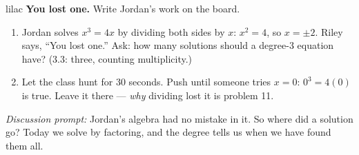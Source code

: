 \documentclass[10pt]{article}
\begin{document}
\begin{skillbox}{lilac}
    \textbf{You lost one.} Write Jordan's work on the board.
    \begin{enumerate}[itemsep=2pt]
        \item Jordan solves $x^3 = 4x$ by dividing both sides by $x$: $x^2 = 4$, so $x = \pm 2$.
              Riley says, ``You lost one.'' Ask: how many solutions should a degree-3
              equation have? (3.3: three, counting multiplicity.)
        \item Let the class hunt for 30 seconds. Push until someone tries $x = 0$:
              $0^3 = 4(0)$ is true. Leave it there --- \emph{why} dividing lost it is problem 11.
    \end{enumerate}
    \textit{Discussion prompt:} Jordan's algebra had no mistake in it. So where did a solution
    go? Today we solve by factoring, and the degree tells us when we have found them all.
\end{skillbox}
\end{document}
